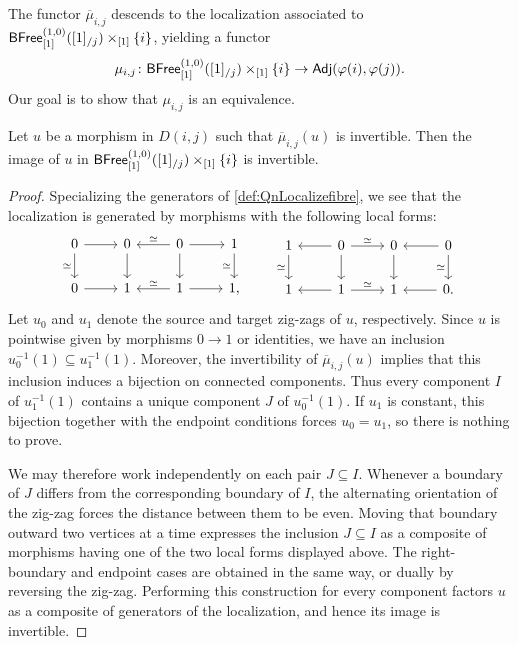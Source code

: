 \documentclass[a4paper,reqno,twoside]{amsart}
\begin{document}
The functor $\overline{\mu}_{i,j}$ descends to the localization associated to $\mathsf{BFree}^{(1,0)}_{[1]}([1]_{/j})\times_{[1]}\{i\}$, yielding a functor
\begin{equation}\label{eq:mu}
	\mu_{i,j} \colon \mathsf{BFree}^{(1,0)}_{[1]}([1]_{/j})\times_{[1]}\{i\} \to \mathsf{Adj}(\varphi(i),\varphi(j)).
\end{equation}
Our goal is to show that $\mu_{i,j}$ is an equivalence. 

\begin{lemma}\label{lem:pi0iso}
	Let $u$ be a morphism in $D(i,j)$ such that $\overline{\mu}_{i,j}(u)$ is invertible. Then the image of $u$ in $\mathsf{BFree}^{(1,0)}_{[1]}([1]_{/j})\times_{[1]}\{i\}$ is invertible. 
\end{lemma}
\begin{proof}
	Specializing the generators of \cref{def:QnLocalizefibre}, we see that the localization is generated by morphisms with the following local forms:
	\[
		\begin{tikzcd}
	0 & 0 & 0 & 1 \\
	0 & 1 & 1 & 1{,}
	\arrow[ from=1-1, to=1-2]
	\arrow["\simeq", swap, from=1-1, to=2-1]
	\arrow[ from=1-2, to=2-2]
	\arrow["\simeq"', from=1-3, to=1-2]
	\arrow[ from=1-3, to=1-4]
	\arrow[ from=1-3, to=2-3]
	\arrow[swap, "\simeq ",from=1-4, to=2-4]
	\arrow[ from=2-1, to=2-2]
	\arrow["\simeq"', from=2-3, to=2-2]
	\arrow[ from=2-3, to=2-4]
\end{tikzcd} \quad \quad  	\begin{tikzcd}
	1 & 0 & 0 & 0 \\
	1 & 1 & 1 & 0{.}
	\arrow[swap,"\simeq ", from=1-1, to=2-1]
	\arrow[ from=1-2, to=1-1]
	\arrow["\simeq", from=1-2, to=1-3]
	\arrow[ from=1-2, to=2-2]
	\arrow[ from=1-3, to=2-3]
	\arrow[ from=1-4, to=1-3]
	\arrow[swap, "\simeq ", from=1-4, to=2-4]
	\arrow[ from=2-2, to=2-1]
	\arrow["\simeq", from=2-2, to=2-3]
	\arrow[ from=2-4, to=2-3]
\end{tikzcd}
	\]
	Let $u_0$ and $u_1$ denote the source and target zig-zags of $u$, respectively. Since $u$ is pointwise given by morphisms $0\to1$ or identities, we have an inclusion $u_0^{-1}(1)\subseteq u_1^{-1}(1)$. Moreover, the invertibility of $\overline{\mu}_{i,j}(u)$ implies that this inclusion induces a bijection on connected components. Thus every component $I$ of $u_1^{-1}(1)$ contains a unique component $J$ of $u_0^{-1}(1)$. If $u_1$ is constant, this bijection together with the endpoint conditions forces $u_0=u_1$, so there is nothing to prove.

	We may therefore work independently on each pair $J\subseteq I$. Whenever a boundary of $J$ differs from the corresponding boundary of $I$, the alternating orientation of the zig-zag forces the distance between them to be even. Moving that boundary outward two vertices at a time expresses the inclusion $J\subseteq I$ as a composite of morphisms having one of the two local forms displayed above. The right-boundary and endpoint cases are obtained in the same way, or dually by reversing the zig-zag. Performing this construction for every component factors $u$ as a composite of generators of the localization, and hence its image is invertible.
\end{proof}
\end{document}
